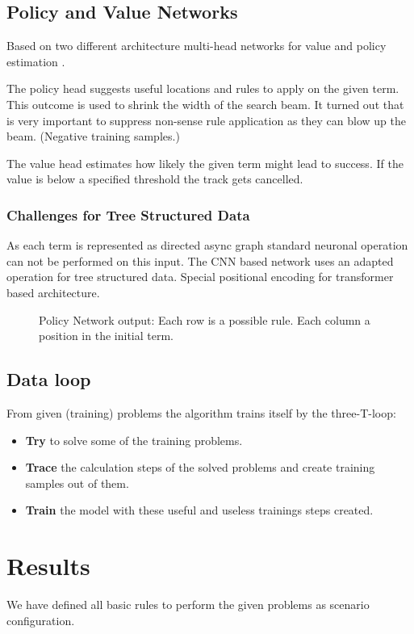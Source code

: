 \documentclass{scrartcl}
\begin{document}
\subsection{Policy and Value Networks}

Based on two different architecture multi-head networks for value and policy estimation \cite{44806}.

The policy head suggests useful locations and rules to apply on the given term. This outcome is used to shrink the width of the search beam.
It turned out that is very important to suppress non-sense rule application as they can blow up the beam. (Negative training samples.)

The value head estimates how likely the given term might lead to success. If the value is below a specified threshold the track gets cancelled.

\subsubsection{Challenges for Tree Structured Data}
As each term is represented as directed async graph standard neuronal operation can not be performed on this input.
The CNN based network uses an adapted operation for tree structured data.
Special positional encoding for transformer based architecture.

\begin{figure}[!htbp]
	\centering
	
	\caption{Policy Network output: Each row is a possible rule. Each column a position in the initial term.} \label{fig:M1}
\end{figure}

\subsection{Data loop}

From given (training) problems the algorithm trains itself by the three-T-loop: 

\begin{itemize}
	\item \textbf{Try} to solve some of the training problems.
	\item \textbf{Trace} the calculation steps of the solved problems and create training samples out of them.
	\item \textbf{Train} the model with these useful and useless trainings steps created.
\end{itemize}

\section{Results}
We have defined all basic rules to perform the given problems as scenario configuration.
\end{document}

